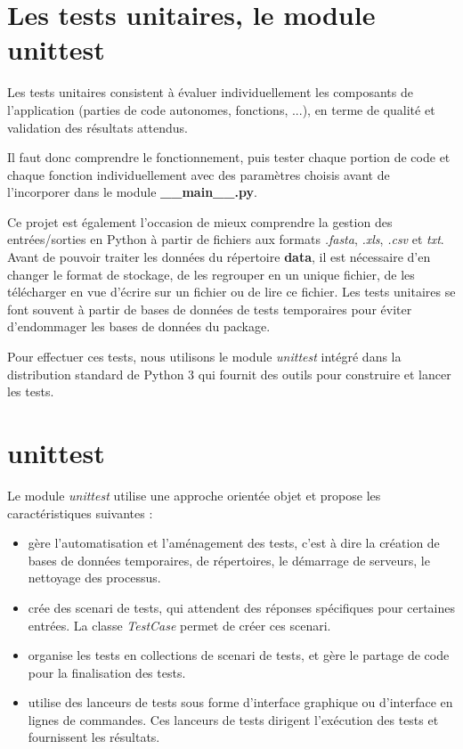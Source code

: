 \documentclass[twoside,a4paper,11pt,frenchb,openany]{report}
\begin{document}
\section{Les tests unitaires, le module unittest}

Les tests unitaires consistent à évaluer individuellement les composants de l'application (parties de code autonomes, fonctions, ...), en terme de qualité et validation des résultats attendus.

Il faut donc comprendre le fonctionnement, puis tester chaque portion de code et chaque fonction individuellement avec des paramètres choisis avant de l'incorporer dans le module \textbf{\_\_main\_\_.py}. 

Ce projet est également l'occasion de mieux comprendre la gestion des entrées/sorties en Python à partir de fichiers aux formats \textit{.fasta}, \textit{.xls}, \textit{.csv} et \textit{txt}. Avant de pouvoir traiter les données du répertoire \textbf{data}, il est nécessaire d'en changer le format de stockage, de les regrouper en un unique fichier, de les télécharger en vue d'écrire sur un fichier ou de lire ce fichier. Les tests unitaires se font souvent à partir de bases de données de tests temporaires pour éviter d'endommager les bases de données du package. 

Pour effectuer ces tests, nous utilisons le module \textit{unittest} intégré dans la distribution standard de Python 3 qui fournit des outils pour construire et lancer les tests.





\section{unittest}

Le module \textit{unittest} utilise une approche orientée objet et propose les caractéristiques suivantes :

\begin{itemize}
\item gère l'automatisation et l'aménagement des tests, c'est à dire la création de bases de données temporaires, de répertoires, le démarrage de serveurs, le nettoyage des processus.
\item crée des scenari de tests, qui attendent des réponses spécifiques pour certaines entrées. La classe \textit{TestCase} permet de créer ces scenari.
\item organise les tests en collections de scenari de tests, et gère le partage de code pour la finalisation des tests.
\item utilise des lanceurs de tests sous forme d'interface graphique ou d'interface en lignes de commandes. Ces lanceurs de tests dirigent l'exécution des tests et fournissent les résultats.
\end{itemize}
\end{document}
